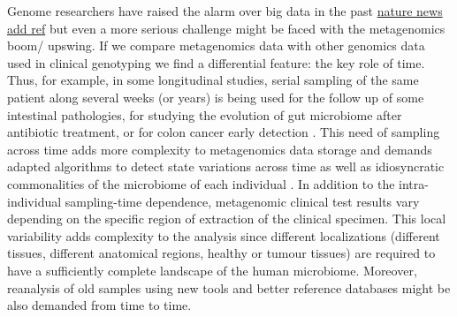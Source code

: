 \documentclass{frontiersSCNS} %
\begin{document}
Genome researchers have raised the alarm over big data in the past
\href{http://www.nature.com/news/genome-researchers-raise-alarm-over-big-data-1.17912}{nature
news add ref} but even a more serious challenge might be faced with the
metagenomics boom/ upswing. If we compare metagenomics data with other
genomics data used in clinical genotyping we find a differential
feature: the key role of time. Thus, for example, in some longitudinal
studies, serial sampling of the same patient along several weeks (or
years) is being used for the follow up of some intestinal pathologies,
for studying the evolution of gut microbiome after antibiotic treatment,
or for colon cancer early detection \citep{zeller2014potential}. This
need of sampling across time adds more complexity to metagenomics data
storage and demands adapted algorithms to detect state variations across
time as well as idiosyncratic commonalities of the microbiome of each
individual \citep{Franzosa-2015}. In addition to the intra-individual
sampling-time dependence, metagenomic clinical test results vary
depending on the specific region of extraction of the clinical specimen.
This local variability adds complexity to the analysis since different
localizations (different tissues, different anatomical regions, healthy
or tumour tissues) are required to have a sufficiently complete
landscape of the human microbiome. Moreover, reanalysis of old samples
using new tools and better reference databases might be also demanded
from time to time.
\end{document}
